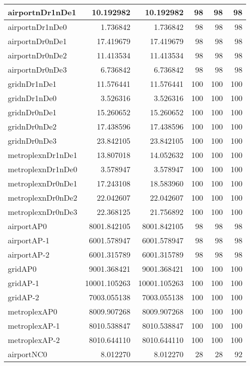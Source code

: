 \begin{longtable}{|l|r|r|r|r|r|}
\endlastfoot
airportnDr1nDe1 & 10.192982 & 10.192982 & 98 & 98 & 98 \\ \hline
airportnDr1nDe0 & 1.736842 & 1.736842 & 98 & 98 & 98 \\ \hline
airportnDr0nDe1 & 17.419679 & 17.419679 & 98 & 98 & 98 \\ \hline
airportnDr0nDe2 & 11.413534 & 11.413534 & 98 & 98 & 98 \\ \hline
airportnDr0nDe3 & 6.736842 & 6.736842 & 98 & 98 & 98 \\ \hline
gridnDr1nDe1 & 11.576441 & 11.576441 & 100 & 100 & 100 \\ \hline
gridnDr1nDe0 & 3.526316 & 3.526316 & 100 & 100 & 100 \\ \hline
gridnDr0nDe1 & 15.260652 & 15.260652 & 100 & 100 & 100 \\ \hline
gridnDr0nDe2 & 17.438596 & 17.438596 & 100 & 100 & 100 \\ \hline
gridnDr0nDe3 & 23.842105 & 23.842105 & 100 & 100 & 100 \\ \hline
metroplexnDr1nDe1 & 13.807018 & 14.052632 & 100 & 100 & 100 \\ \hline
metroplexnDr1nDe0 & 3.578947 & 3.578947 & 100 & 100 & 100 \\ \hline
metroplexnDr0nDe1 & 17.243108 & 18.583960 & 100 & 100 & 100 \\ \hline
metroplexnDr0nDe2 & 22.042607 & 22.042607 & 100 & 100 & 100 \\ \hline
metroplexnDr0nDe3 & 22.368125 & 21.756892 & 100 & 100 & 100 \\ \hline
airportAP0 & 8001.842105 & 8001.842105 & 98 & 98 & 98 \\ \hline
airportAP-1 & 6001.578947 & 6001.578947 & 98 & 98 & 98 \\ \hline
airportAP-2 & 6001.315789 & 6001.315789 & 98 & 98 & 98 \\ \hline
gridAP0 & 9001.368421 & 9001.368421 & 100 & 100 & 100 \\ \hline
gridAP-1 & 10001.105263 & 10001.105263 & 100 & 100 & 100 \\ \hline
gridAP-2 & 7003.055138 & 7003.055138 & 100 & 100 & 100 \\ \hline
metroplexAP0 & 8009.907268 & 8009.907268 & 100 & 100 & 100 \\ \hline
metroplexAP-1 & 8010.538847 & 8010.538847 & 100 & 100 & 100 \\ \hline
metroplexAP-2 & 8010.644110 & 8010.644110 & 100 & 100 & 100 \\ \hline
airportNC0 & 8.012270 & 8.012270 & 28 & 28 & 92 \\ \hline

\end{longtable}
